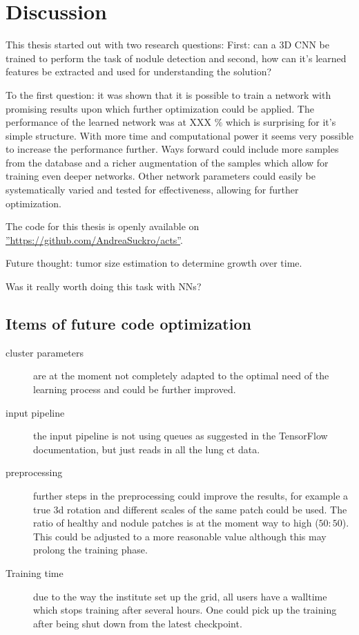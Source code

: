 \documentclass[main.tex]{subfiles}
\begin{document}
\chapter{Discussion}\label{chap:discussion}

This thesis started out with two research questions: First: can a 3D CNN be trained to perform the task of nodule detection and second, how can it's learned features be extracted and used for understanding the solution? 

To the first question: it was shown that it is possible to train a network with promising results upon which further optimization could be applied. The performance of the learned network was at XXX $\%$ which is surprising for it's simple structure. With more time and computational power it seems very possible to increase the performance further. Ways forward could include more samples from the database and a richer augmentation of the samples which allow for training even deeper networks. Other network parameters could easily be systematically varied and tested for effectiveness, allowing for further optimization.

The code for this thesis is openly available on \hyperref[GitHub]{''https://github.com/AndreaSuckro/acts''}. 

Future thought: tumor size estimation to determine growth over time.

Was it really worth doing this task with NNs?

\section{Items of future code optimization}
\begin{description}
\item[cluster parameters] are at the moment not completely adapted to the optimal need of the learning process and could be further improved.
\item[input pipeline] the input pipeline is not using queues as suggested in the TensorFlow documentation, but just reads in all the lung ct data.
\item[preprocessing] further steps in the preprocessing could improve the results, for example a true 3d rotation and different scales of the same patch could be used. The ratio of healthy and nodule patches is at the moment way to high ($50:50$). This could be adjusted to a more reasonable value although this may prolong the training phase.
\item[Training time] due to the way the institute set up the grid, all users have a walltime which stops training after several hours. One could pick up the training after being shut down from the latest checkpoint.
\end{description}
\end{document}
